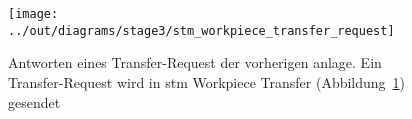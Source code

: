 \begin{figure}
    \centering
    \texttt{[image: ../out/diagrams/stage3/stm\_workpiece\_transfer\_request]}
    \caption{Antworten eines Transfer-Request der vorherigen \gls{anlage}.
    Ein Transfer-Request wird in stm Workpiece Transfer (Abbildung~\ref{fig:stm_workpiece_transfer_request}) gesendet}
    \label{fig:stm_workpiece_transfer_request}
\end{figure}



